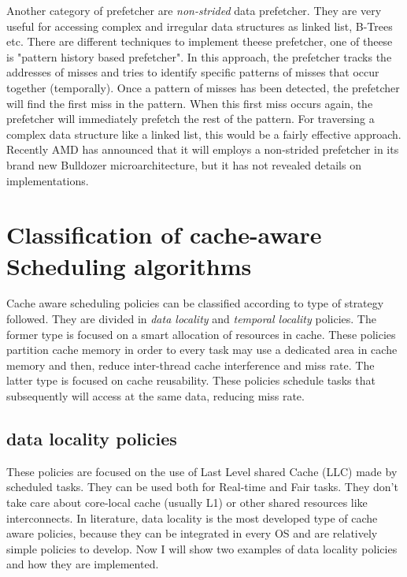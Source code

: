Another category of prefetcher are \textit{non-strided} data prefetcher. They are very useful for accessing complex and irregular data structures as 
linked list, B-Trees etc. There are different techniques to implement theese prefetcher, one of theese is "pattern history based prefetcher". 
In this approach, the prefetcher tracks the addresses of misses and tries to identify specific patterns of misses that occur together (temporally). 
Once a pattern of misses has been detected, the prefetcher will find the first miss in the pattern. When this first miss occurs again, the prefetcher 
will immediately prefetch the rest of the pattern. For traversing a complex data structure like a linked list, this would be a fairly effective approach.
Recently AMD has announced that it will employs a non-strided prefetcher in its brand new Bulldozer microarchitecture, but it has not revealed details on 
implementations.

\section{Classification of cache-aware Scheduling algorithms}

Cache aware scheduling policies can be classified according to type of strategy followed. They are divided in \textit{data locality} and 
\textit{temporal locality} policies. The former type is focused on a smart allocation of resources in cache. These policies partition cache memory in order
to every task may use a dedicated area in cache memory and then, reduce inter-thread cache interference and miss rate.
The latter type is focused on cache reusability. These policies schedule tasks that subsequently will access at the same data, reducing miss rate.

\subsection{data locality policies} 

These policies are focused on the use of Last Level shared Cache (LLC) made by scheduled tasks. They can be used both for Real-time and Fair tasks. 
They don't take care about core-local cache (usually L1) or other shared resources like interconnects. In literature, data locality is the most developed 
type of cache aware policies, because they can be integrated in every OS and are relatively simple policies to develop. Now I will show two examples of 
data locality policies and how they are implemented.

